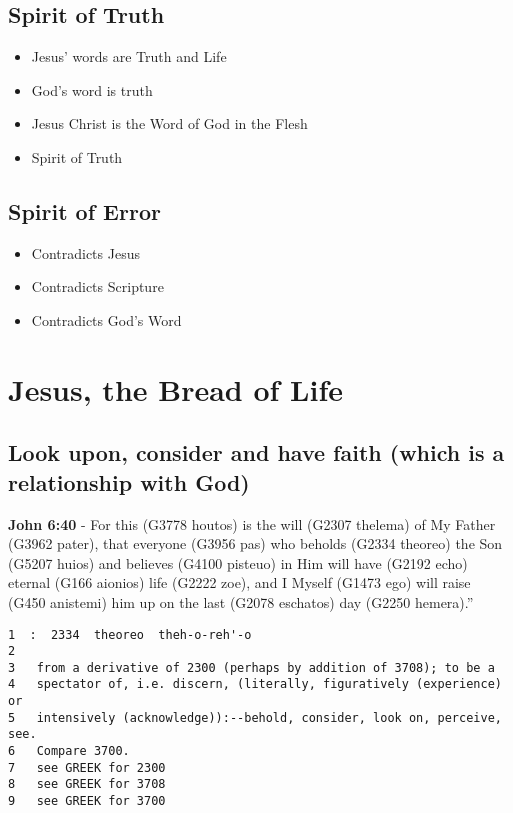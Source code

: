 \documentclass[11pt]{article}
\begin{document}
\subsection{Spirit of Truth}
\label{sec:org5a15bc1}
\begin{itemize}
\item Jesus' words are Truth and Life
\item God's word is truth
\item Jesus Christ is the Word of God in the Flesh
\item Spirit of Truth
\end{itemize}

\subsection{Spirit of Error}
\label{sec:org09a9f0e}
\begin{itemize}
\item Contradicts Jesus
\item Contradicts Scripture
\item Contradicts God's Word
\end{itemize}

\section{Jesus, the Bread of Life}
\label{sec:org8a43b4d}
\subsection{Look upon, consider and have faith (which is a relationship with God)}
\label{sec:orga3e0fef}
\textbf{John 6:40} - For this (G3778 houtos) is the will (G2307 thelema) of My Father (G3962 pater), that everyone (G3956 pas) who beholds (G2334 theoreo) the Son (G5207 huios) and believes (G4100 pisteuo) in Him will have (G2192 echo) eternal (G166 aionios) life (G2222 zoe), and I Myself (G1473 ego) will raise (G450 anistemi) him up on the last (G2078 eschatos) day (G2250 hemera).”

\begin{verbatim}
1  :  2334  theoreo  theh-o-reh'-o
2  
3   from a derivative of 2300 (perhaps by addition of 3708); to be a
4   spectator of, i.e. discern, (literally, figuratively (experience) or
5   intensively (acknowledge)):--behold, consider, look on, perceive, see.
6   Compare 3700.
7   see GREEK for 2300
8   see GREEK for 3708
9   see GREEK for 3700
\end{verbatim}
\end{document}
